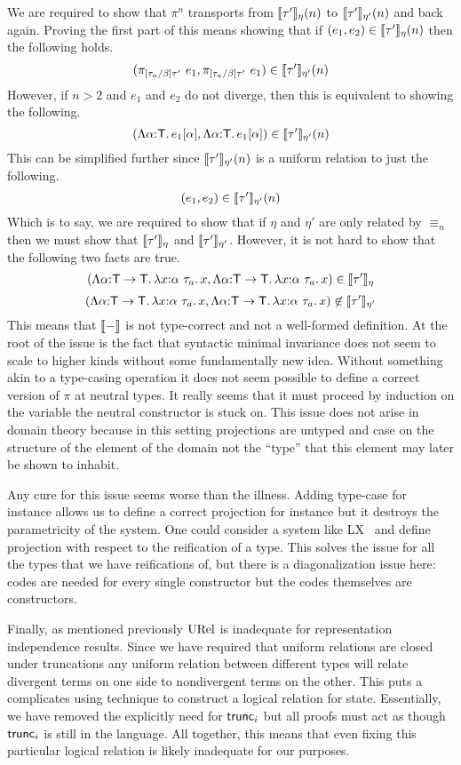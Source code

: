 We are required to show that $\pi^n$ transports from
$\llbracket \tau' \rrbracket_\eta(n)$ to $\llbracket \tau' \rrbracket_{\eta'}(n)$ and back again. Proving
the first part of this means showing that if
$(e_1, e_2) \in \llbracket \tau' \rrbracket_\eta(n)$ then the following holds.
\[
  (\pi_{[\tau_a/\beta]\tau'}\ e_1, \pi_{[\tau_a/\beta]\tau'}\ e_1)
  \in \llbracket \tau' \rrbracket_{\eta'}(n)
\]
However, if $n > 2$ and $e_1$ and $e_2$ do not diverge, then this is
equivalent to showing the following.
\[
  (\Lambda \alpha {:} \mathsf{T}.\, e_1[\alpha], \Lambda \alpha {:} \mathsf{T}.\, e_1[\alpha])
  \in \llbracket \tau' \rrbracket_{\eta'}(n)
\]
This can be simplified further since $\llbracket \tau' \rrbracket_{\eta'}(n)$ is a uniform
relation to just the following.
\[
  (e_1, e_2) \in \llbracket \tau' \rrbracket_{\eta'}(n)
\]
Which is to say, we are required to show that if $\eta$ and $\eta'$
are only related by $\equiv_n$ then we must show that
$\llbracket \tau' \rrbracket_{\eta}$ and $\llbracket \tau' \rrbracket_{\eta'}$. However, it is not
hard to show that the following two facts are true.
\[
  (\Lambda \alpha {:} \mathsf{T} \to \mathsf{T}.\, \lambda x {:} \alpha\ \tau_a.\, x,
   \Lambda \alpha {:} \mathsf{T} \to \mathsf{T}.\, \lambda x {:} \alpha\ \tau_a.\, x)
   \in \llbracket \tau' \rrbracket_\eta
\]
\[
  (\Lambda \alpha {:} \mathsf{T} \to \mathsf{T}.\, \lambda x {:} \alpha\ \tau_a.\, x,
   \Lambda \alpha {:} \mathsf{T} \to \mathsf{T}.\, \lambda x {:} \alpha\ \tau_a.\, x)
   \not\in \llbracket \tau' \rrbracket_{\eta'}
\]
This means that $\llbracket - \rrbracket$ is not type-correct and not a well-formed
definition. At the root of the issue is the fact that syntactic
minimal invariance does not seem to scale to higher kinds without some
fundamentally new idea. Without something akin to a type-casing
operation it does not seem possible to define a correct version of
$\pi$ at neutral types. It really seems that it must proceed by
induction on the variable the neutral constructor is stuck on. This
issue does not arise in domain theory because in this setting
projections are untyped and case on the structure of the element of
the domain not the ``type'' that this element may later be shown to
inhabit.

Any cure for this issue seems worse than the illness. Adding type-case
for instance allows us to define a correct projection for instance but
it destroys the parametricity of the system. One could consider a
system like LX~\citep{Crary:99} and define projection with respect to
the reification of a type. This solves the issue for all the
types that we have reifications of, but there is a diagonalization
issue here: codes are needed for every single constructor but the
codes themselves are constructors.

Finally, as mentioned previously $\mathrm{URel}$ is inadequate for
representation independence results. Since we have required that
uniform relations are closed under truncations any uniform relation
between different types will relate divergent terms on one side to
nondivergent terms on the other. This puts a complicates using
technique to construct a logical relation for state. Essentially, we
have removed the explicitly need for $\mathsf{trunc}_i$ but all proofs must
act as though $\mathsf{trunc}_i$ is still in the language. All together, this
means that even fixing this particular logical relation is likely
inadequate for our purposes.

